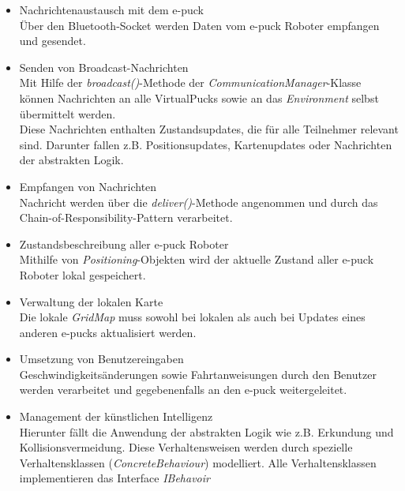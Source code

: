 \documentclass[10pt,a4paper]{article}
\begin{document}
		\begin{itemize}
			\item Nachrichtenaustausch mit dem e-puck \\
				Über den Bluetooth-Socket werden Daten vom e-puck Roboter empfangen und gesendet.
			\item Senden von Broadcast-Nachrichten \\
				Mit Hilfe der \textit{broadcast()}-Methode der \textit{CommunicationManager}-Klasse können Nachrichten an alle
				VirtualPucks sowie an das \textit{Environment} selbst übermittelt werden. \\
				Diese Nachrichten enthalten	Zustandsupdates, die für alle Teilnehmer relevant sind. Darunter fallen z.B.
				Positionsupdates, Kartenupdates oder Nachrichten der abstrakten Logik.
			\item Empfangen von Nachrichten  \\
				Nachricht werden über die \textit{deliver()}-Methode angenommen und durch das Chain-of-Responsibility-Pattern verarbeitet.
			\item Zustandsbeschreibung aller e-puck Roboter \\
				Mithilfe von \textit{Positioning}-Objekten wird der aktuelle Zustand aller e-puck Roboter lokal gespeichert.
			\item Verwaltung der lokalen Karte \\
				Die lokale \textit{GridMap} muss sowohl bei lokalen als auch bei Updates eines anderen e-pucks aktualisiert werden. 
			\item Umsetzung von Benutzereingaben \\
				Geschwindigkeitsänderungen sowie Fahrtanweisungen durch den Benutzer werden verarbeitet und gegebenenfalls
				an den e-puck weitergeleitet.
			\item Management der künstlichen Intelligenz \\
				Hierunter fällt die Anwendung der abstrakten Logik wie z.B. Erkundung und Kollisionsvermeidung. Diese Verhaltensweisen werden durch
				spezielle Verhaltensklassen (\textit{ConcreteBehaviour}) modelliert. Alle Verhaltensklassen implementieren das Interface
				\textit{IBehavoir}
		\end{itemize} 
  		
\end{document}
